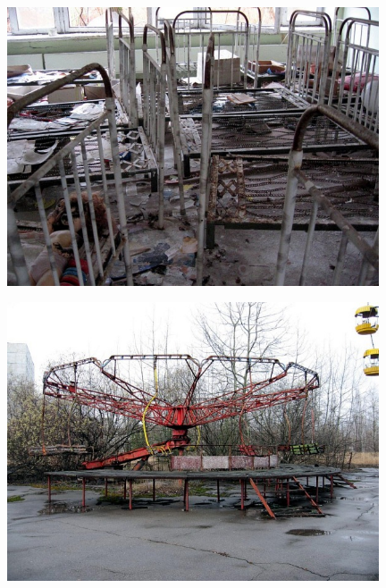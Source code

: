 \documentclass{beamer}
\begin{document}
\begin{frame}[plain]{}
    \begin{center}
        \includegraphics[width=11cm]{img/Heute_2.jpg}\\
    \end{center}
\end{frame}

\begin{frame}[plain]{}
    \begin{center}
        \includegraphics[width=11cm]{img/Heute_3.jpg}\\
    \end{center}
\end{frame}
\end{document}

